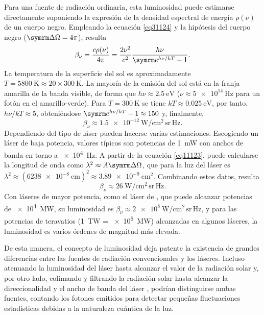 Para una fuente de radiación ordinaria, esta luminosidad puede estimarse directamente suponiendo la expresión de la densidad espectral de energía $\rho(\nu)$ de un cuerpo negro. Empleando la ecuación \eqref{eq31124} y la hipótesis del cuerpo negro ($\del\Omega=4\pi$), resulta
\begin{equation}
    \label{eq41124}
    \beta_{\nu} = \frac{c\rho(\nu)}{4\pi} = \frac{2\nu^2}{c^2}\dfrac{h\nu}{\eu^{h\nu/kT}-1}.
\end{equation}
La temperatura de la superficie del sol es aproximadamente $T = \qty{5800}{\K} \approx 20 \times \qty{300}{\K}$. La mayoría de la emisión del sol está en la franja amarilla de la banda visible, de forma que $h\nu \approx \qty{2,5}{\eV}$ ($\nu \approx \qty{5e14}{\Hz}$ para un fotón en el amarillo-verde). Para $T = \qty{300}{\K}$ se tiene $kT \approx \qty{0,025}{\eV}$, por tanto, $h\nu/kT \approx 5$, obteniéndose $\eu^{h\nu/kT}-1 \approx 150$ y, finalmente,
\begin{equation}
    \label{eq51124}
    \beta_{\nu} \approx \qty{1,5e-12}{\W\per\cm^2\,\steradian\,\Hz}.
\end{equation}
Dependiendo del tipo de láser pueden hacerse varias estimaciones. Escogiendo un láser  de baja potencia, valores típicos\autocite{Milonni1988Lasers} son potencias de \qty{1}{\mW} con anchos de banda en torno a \qty{e4}{\Hz}. A partir de la ecuación \eqref{eq11123}, puede calcularse la longitud de onda como $\lambda^2 \approx A\del\Omega$, que para la luz del láser  es $\lambda^2 \approx (\qty{6238e-8}{\cm})^2 \approx \qty{3,89e-9}{\cm^2}$. Combinando estos datos, resulta 
\begin{equation}
    \label{eq61124}
    \beta_{\nu} \approx \qty{26}{\W\per\cm^2\,\steradian\,\Hz}.
\end{equation}
Con láseres de mayor potencia, como el láser de , que puede alcanzar potencias de \qty{e4}{\MW}, su luminosidad es $\beta_{\nu} \approx \qty{2e8}{\W\per\cm^2\,\steradian\,\Hz}$, y para las potencias de teravatios (\qty{1}{\tera\W} = \qty{e6}{\MW}) alcanzadas en algunos láseres, la luminosidad es varios órdenes de magnitud más elevada.

De esta manera, el concepto de luminosidad deja patente la existencia de grandes diferencias entre las fuentes de radiación convencionales y los láseres. Incluso atenuando la luminosidad del láser  hasta alcanzar el valor de la radiación solar y, por otro lado, colimando y filtrando la radiación solar hasta alcanzar la direccionalidad y el ancho de banda del láser , podrían distinguirse ambas fuentes, contando los fotones emitidos para detectar pequeñas fluctuaciones estadísticas debidas a la naturaleza cuántica de la luz. 

